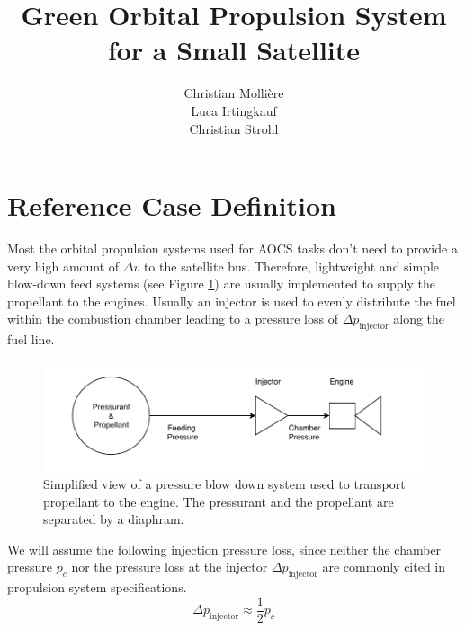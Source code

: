 \documentclass[12pt]{article}
\begin{document}
 
 
\title{Green Orbital Propulsion System for a Small Satellite}
\author{Christian Molli\`ere\\Luca Irtingkauf\\Christian Strohl}
\maketitle
\newpage

\section{Reference Case Definition}
\label{chap:reference_case}
Most the orbital propulsion systems used for AOCS tasks don't need to provide a very high amount of $\Delta v$ to the satellite bus. Therefore, lightweight and simple blow-down feed systems (see Figure \ref{fig:blowdown_system}) are usually implemented to supply the propellant to the engines. Usually an injector is used to evenly distribute the fuel within the combustion chamber leading to a pressure loss of $\Delta p_{\text{injector}}$ along the fuel line.\\

\begin{figure}[!h]
	\centering
	\includegraphics[width=\linewidth]{figures/blowdown_sketch}
	\caption{Simplified view of a pressure blow down system used to transport propellant to the engine. The pressurant and the propellant are separated by a diaphram.}
	\label{fig:blowdown_system}
\end{figure}

We will assume the following injection pressure loss, since neither the chamber pressure $p_c$ nor the pressure loss at the injector $\Delta p_{\text{injector}}$ are commonly cited in propulsion system specifications.
\begin{equation}
	\Delta p_{\text{injector}} \approx \frac{1}{2}p_c 
	\label{eq:injector_loss_assumption}
\end{equation}
\end{document}
